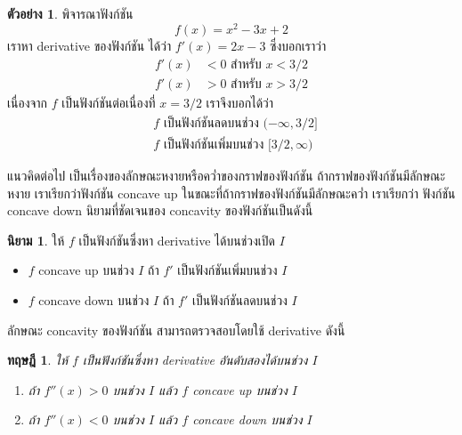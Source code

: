 \documentclass[
]{book}
\newtheorem{theorem}{ทฤษฎี}[chapter]
\theoremstyle{definition}
\newtheorem{definition}{นิยาม}[chapter]
\theoremstyle{definition}
\newtheorem{example}{ตัวอย่าง}[chapter]
\theoremstyle{definition}
\theoremstyle{definition}
\theoremstyle{remark}
\begin{document}
\begin{example}
พิจารณาฟังก์ชัน \[f(x) = x^2-3x+2\] เราหา derivative ของฟังก์ชัน ได้ว่า
\(f'(x) = 2x-3\) ซึ่งบอกเราว่า \begin{equation}   \begin{aligned}
    f'(x) &< 0 \text{ สำหรับ $x < 3/2$} \\
    f'(x) &> 0 \text{ สำหรับ $x > 3/2$}
  \end{aligned} \end{equation} เนื่องจาก \(f\) เป็นฟังก์ชันต่อเนื่องที่ \(x=3/2\) เราจึงบอกได้ว่า
\begin{equation}   \begin{aligned}
    \text{ $f$ เป็นฟังก์ชันลดบนช่วง $(-\infty,3/2]$} \\
    \text{ $f$ เป็นฟังก์ชันเพิ่มบนช่วง $[3/2,\infty)$}
  \end{aligned} \end{equation}
\end{example}

แนวคิดต่อไป เป็นเรื่องของลักษณะหงายหรือคว่ำของกราฟของฟังก์ชัน
ถ้ากราฟของฟังก์ชันมีลักษณะหงาย เราเรียกว่าฟังก์ชัน concave up
ในขณะที่ถ้ากราฟของฟังก์ชันมีลักษณะคว่ำ เราเรียกว่า ฟังก์ชัน concave down นิยามที่ชัดเจนของ
concavity ของฟังก์ชันเป็นดังนี้

\begin{definition}

ให้ \(f\) เป็นฟังก์ชันซึ่งหา derivative ได้บนช่วงเปิด \(I\)

\begin{itemize}
\item
  \(f\) concave up บนช่วง \(I\) ถ้า \(f'\) เป็นฟังก์ชันเพิ่มบนช่วง \(I\)
\item
  \(f\) concave down บนช่วง \(I\) ถ้า \(f'\) เป็นฟังก์ชันลดบนช่วง \(I\)
\end{itemize}

\end{definition}

ลักษณะ concavity ของฟังก์ชัน สามารถตรวจสอบโดยใช้ derivative ดังนี้

\begin{theorem}

ให้ \(f\) เป็นฟังก์ชันซึ่งหา derivative อันดับสองได้บนช่วง \(I\)

\begin{enumerate}
\def\labelenumi{\arabic{enumi}.}
\item
  ถ้า \(f''(x) > 0\) บนช่วง \(I\) แล้ว \(f\) concave up บนช่วง \(I\)
\item
  ถ้า \(f''(x) < 0\) บนช่วง \(I\) แล้ว \(f\) concave down บนช่วง \(I\)
\end{enumerate}

\end{theorem}
\end{document}
